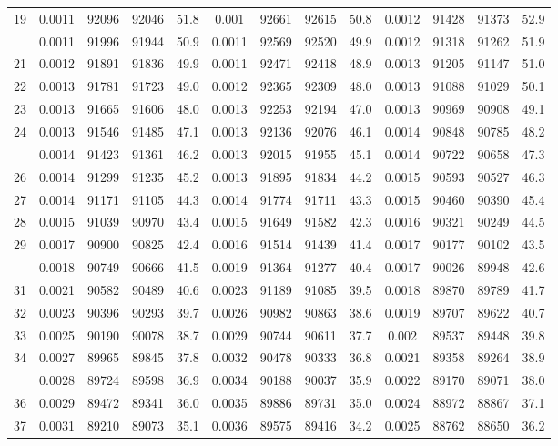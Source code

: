 \documentclass[
  14pt,
]{article}
\begin{document}
\begin{longtable}[t]{lcccccccccccc}
19 & 0.0011 & 92096 & 92046 & 51.8 & 0.001 & 92661 & 92615 & 50.8 & 0.0012 & 91428 & 91373 & 52.9\\
\addlinespace
20 & 0.0011 & 91996 & 91944 & 50.9 & 0.0011 & 92569 & 92520 & 49.9 & 0.0012 & 91318 & 91262 & 51.9\\
21 & 0.0012 & 91891 & 91836 & 49.9 & 0.0011 & 92471 & 92418 & 48.9 & 0.0013 & 91205 & 91147 & 51.0\\
22 & 0.0013 & 91781 & 91723 & 49.0 & 0.0012 & 92365 & 92309 & 48.0 & 0.0013 & 91088 & 91029 & 50.1\\
23 & 0.0013 & 91665 & 91606 & 48.0 & 0.0013 & 92253 & 92194 & 47.0 & 0.0013 & 90969 & 90908 & 49.1\\
24 & 0.0013 & 91546 & 91485 & 47.1 & 0.0013 & 92136 & 92076 & 46.1 & 0.0014 & 90848 & 90785 & 48.2\\
\addlinespace
25 & 0.0014 & 91423 & 91361 & 46.2 & 0.0013 & 92015 & 91955 & 45.1 & 0.0014 & 90722 & 90658 & 47.3\\
26 & 0.0014 & 91299 & 91235 & 45.2 & 0.0013 & 91895 & 91834 & 44.2 & 0.0015 & 90593 & 90527 & 46.3\\
27 & 0.0014 & 91171 & 91105 & 44.3 & 0.0014 & 91774 & 91711 & 43.3 & 0.0015 & 90460 & 90390 & 45.4\\
28 & 0.0015 & 91039 & 90970 & 43.4 & 0.0015 & 91649 & 91582 & 42.3 & 0.0016 & 90321 & 90249 & 44.5\\
29 & 0.0017 & 90900 & 90825 & 42.4 & 0.0016 & 91514 & 91439 & 41.4 & 0.0017 & 90177 & 90102 & 43.5\\
\addlinespace
30 & 0.0018 & 90749 & 90666 & 41.5 & 0.0019 & 91364 & 91277 & 40.4 & 0.0017 & 90026 & 89948 & 42.6\\
31 & 0.0021 & 90582 & 90489 & 40.6 & 0.0023 & 91189 & 91085 & 39.5 & 0.0018 & 89870 & 89789 & 41.7\\
32 & 0.0023 & 90396 & 90293 & 39.7 & 0.0026 & 90982 & 90863 & 38.6 & 0.0019 & 89707 & 89622 & 40.7\\
33 & 0.0025 & 90190 & 90078 & 38.7 & 0.0029 & 90744 & 90611 & 37.7 & 0.002 & 89537 & 89448 & 39.8\\
34 & 0.0027 & 89965 & 89845 & 37.8 & 0.0032 & 90478 & 90333 & 36.8 & 0.0021 & 89358 & 89264 & 38.9\\
\addlinespace
35 & 0.0028 & 89724 & 89598 & 36.9 & 0.0034 & 90188 & 90037 & 35.9 & 0.0022 & 89170 & 89071 & 38.0\\
36 & 0.0029 & 89472 & 89341 & 36.0 & 0.0035 & 89886 & 89731 & 35.0 & 0.0024 & 88972 & 88867 & 37.1\\
37 & 0.0031 & 89210 & 89073 & 35.1 & 0.0036 & 89575 & 89416 & 34.2 & 0.0025 & 88762 & 88650 & 36.2\\

\end{longtable}
\end{document}

